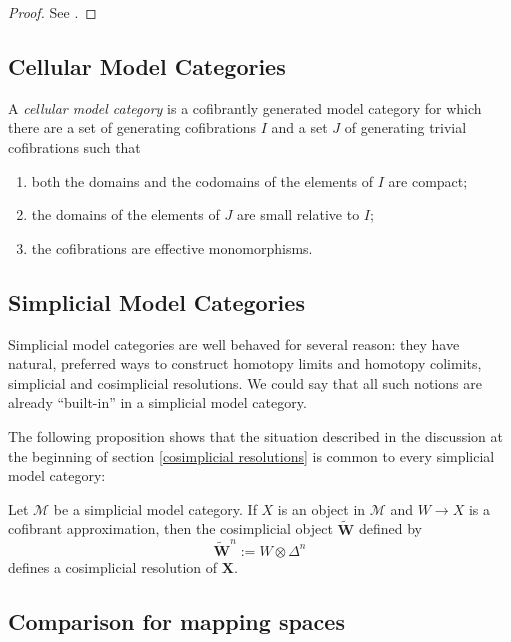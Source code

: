 \begin{refsection}
\begin{proof}
See \cite[Prop. A.2.8.2]{htt}.
\end{proof}

\subsection{Cellular Model Categories}

\begin{defin}
A \emph{cellular model category} is a cofibrantly generated model category for which there are a set of generating cofibrations $I$ and a set $J$ of generating trivial cofibrations such that
\begin{enumerate}
\item both the domains and the codomains of the elements of $I$ are compact;
\item the domains of the elements of $J$ are small relative to $I$;
\item the cofibrations are effective monomorphisms.
\end{enumerate}
\end{defin}

\subsection{Simplicial Model Categories} \label{simplicial model categories}

Simplicial model categories are well behaved for several reason: they have natural, preferred ways to construct homotopy limits and homotopy colimits, simplicial and cosimplicial resolutions. We could say that all such notions are already ``built-in'' in a simplicial model category.

The following proposition shows that the situation described in the discussion at the beginning of section \ref{cosimplicial resolutions} is common to every simplicial model category:

\begin{prop} \label{prop simplicial resolutions simplicial category}
Let $\mathcal M$ be a simplicial model category. If $X$ is an object in $\mathcal M$ and $W \to X$ is a cofibrant approximation, then the cosimplicial object $\widetilde{\mathbf W}$ defined by
\[
\widetilde{\mathbf W}^n := W \otimes \Delta^n
\]
defines a cosimplicial resolution of $\mathbf X$.
\end{prop}

\subsection{Comparison for mapping spaces}

\printbibliography[heading = local]

\end{refsection}
